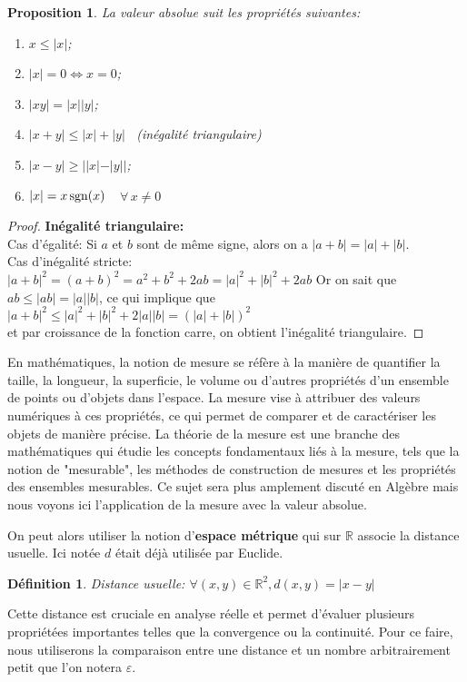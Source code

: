 \documentclass[a4paper, 12pt, french, twoside]{article}
\newtheorem{proposition}[theorem]{Proposition}
\newtheorem{defi}[theorem]{Définition}
\newcommand{\Rr}{{\mathbb{R}}}
\begin{document}
\begin{proposition}\label{prop3}
La valeur absolue suit les propriétés suivantes: 
    \begin{enumerate}
  \item $x\leq |x|$;
  \item $|x|=0 \iff x=0$;
  \item $|xy|=|x||y|$;
  \item $|x+y|\leq |x|+|y|$ \, (inégalité triangulaire)
  \item $|x-y|\geq ||x|-|y||$;
  \item $|x|=x{\, \rm sgn}(x)$ \,\, $\forall \, x \neq0$
\end{enumerate}
\end{proposition}
\begin{proof}
    \textbf{ Inégalité triangulaire: }
\\Cas d'égalité:
Si $a$ et $b$ sont de même signe, alors on a $|a+b|=|a|+|b|$.
\\Cas d'inégalité stricte: 
\\$|a+b|^2 = (a+b)^2 = a^2+b^2+2ab = |a|^2+|b|^2+2ab $
Or on sait que $ab\leq|ab|=|a||b|$, ce qui implique que
\\$|a+b|^2\leq|a|^2+|b|^2+2|a||b|=(|a|+|b|)^2$
\\et par croissance de la fonction carre, on obtient l'inégalité triangulaire. 
\end{proof}



    En mathématiques, la notion de mesure se réfère à la manière de quantifier la taille, la longueur, la superficie, le volume ou d'autres propriétés d'un ensemble de points ou d'objets dans l'espace. La mesure vise à attribuer des valeurs numériques à ces propriétés, ce qui permet de comparer et de caractériser les objets de manière précise. La théorie de la mesure est une branche des mathématiques qui étudie les concepts fondamentaux liés à la mesure, tels que la notion de "mesurable", les méthodes de construction de mesures et les propriétés des ensembles mesurables. Ce sujet sera plus amplement discuté en Algèbre mais nous voyons ici l'application de la mesure avec la valeur absolue.

    On peut alors utiliser la notion d'\textbf{espace métrique} qui sur $\Rr$ associe la distance usuelle. Ici notée $d$ était déjà utilisée par Euclide.
    \begin{defi} Distance usuelle:
        $\forall (x,y)\in\Rr ^2, d(x,y)=|x-y|$
    \end{defi}
    Cette distance est cruciale en analyse réelle et permet d'évaluer plusieurs propriétées importantes telles que la convergence ou la continuité. Pour ce faire, nous utiliserons la comparaison entre une distance et un nombre arbitrairement petit que l'on notera $\varepsilon$.
\end{document}
